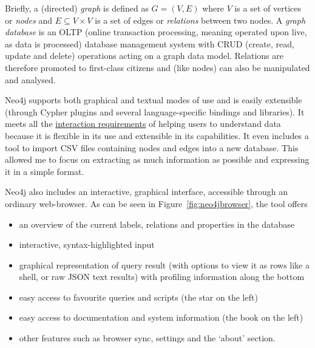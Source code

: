Briefly, a (directed) \emph{graph} is defined as $G = (V, E)$ where $V$ is a set
of vertices or \emph{nodes} and $E \subseteq V \times V$ is a set of edges or
\emph{relations} between two nodes. A \emph{graph database} is an OLTP (online
transaction processing, meaning operated upon live, as data is processed)
database management system with CRUD (create, read, update and delete)
operations acting on a graph data model. Relations are therefore promoted to
first-class citizens and (like nodes) can also be manipulated and analysed.

Neo4j supports both graphical and textual modes of use and is easily extensible
(through Cypher plugins and several language-specific bindings and libraries).
It meets all the \hyperref[req:i1]{interaction requirements} of helping users to
understand data because it is flexible in its use and extensible in its
capabilities.  It even includes a tool to import CSV files containing nodes and
edges into a new database. This allowed me to focus on extracting as much
information as possible and expressing it in a simple format.

Neo4j also includes an interactive, graphical interface, accessible through an
ordinary web-browser. As can be seen in Figure~\ref{fig:neo4jbrowser}, the tool
offers
\begin{itemize}
  \item an overview of the current labels, relations and properties in the
        database
  \item interactive, syntax-highlighted input
  \item graphical representation of query result (with options to view it as
        rows like a shell, or raw JSON text results) with profiling information
        along the bottom
  \item easy access to favourite queries and scripts (the star on the left)
  \item easy access to documentation and system information (the book on the
        left)
  \item other features such as browser sync, settings and the `about' section.
\end{itemize}


